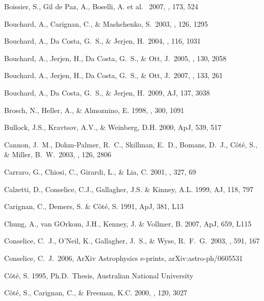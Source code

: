 \documentclass[12pt,preprint]{emulateapj}
\begin{document}
\begin{thebibliography}{}
Boissier, S., Gil de Paz, A., Boselli, A. et al. \ 2007, \apj, 173, 524 

Bouchard, A., Carignan, C., \& Mashchenko, S.\ 2003, \aj, 126, 1295 

Bouchard, A., Da Costa, G.~S., \& Jerjen, H.\ 2004, \pasp, 116, 1031 

Bouchard, A., Jerjen, H., Da Costa, G.~S., \& Ott, J.\ 2005, \aj, 130, 2058 

Bouchard, A., Jerjen, H., Da Costa, G.~S., \& Ott, J.\ 2007, \aj, 133, 261 

Bouchard, A., Da Costa, G.~S., \& Jerjen, H.\ 2009, AJ, 137, 3038

Brosch, N., Heller, A., \& Almoznino, E. 1998, \mnras , 300, 1091

Bullock, J.S., Kravtsov, A.V., \& Weinberg, D.H. 2000, ApJ, 539, 517

Cannon, J.~M., Dohm-Palmer, R.~C., Skillman, E.~D., Bomans, D.~J., 
C{\^o}t{\'e}, S., \& Miller, B.~W.\ 2003, \aj, 126, 2806 

Carraro, G., Chiosi, C., Girardi, L., \& Lia, C. 2001, \mnras, 327, 69 

Calzetti, D., Conselice, C.J., Gallagher, J.S. \& Kinney, A.L. 1999, AJ, 118, 797

Carignan, C., Demers, S. \& C\^ot\'e, S. 1991, ApJ, 381, L13

Chung, A., van GOrkom, J.H., Kenney, J. \& Vollmer, B. 2007, ApJ, 659, L115 

Conselice, C.~J., O'Neil, K., Gallagher, J.~S., \& Wyse, R.~F.~G.\ 2003, \apj, 591, 167 

Conselice, C.~J.\ 2006, ArXiv Astrophysics e-prints, arXiv:astro-ph/0605531 

C\^ot\'e, S. 1995, Ph.D.\ Thesis, Australian National University

C\^ot\'e, S., Carignan, C., \& Freeman, K.C. 2000, \aj , 120, 3027


\end{thebibliography}
\end{document}
